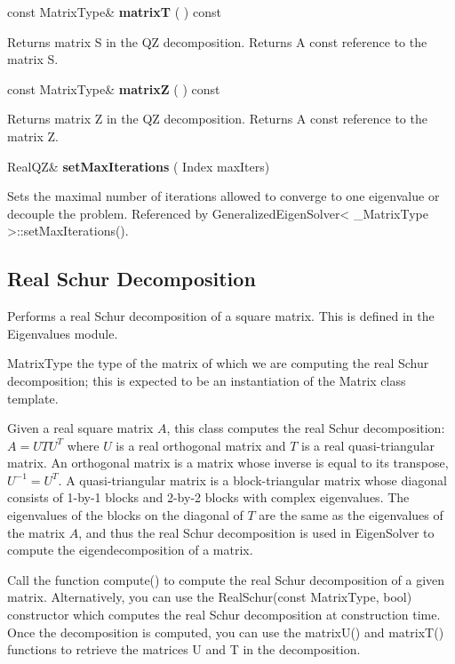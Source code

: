\vspace{0.3cm}
const MatrixType\& \textbf{matrixT}  ( )  const 

Returns matrix S in the QZ decomposition. 
Returns
A const reference to the matrix S. 


\vspace{0.3cm}
const MatrixType\& \textbf{matrixZ}  ( )  const 

Returns matrix Z in the QZ decomposition. 
Returns
A const reference to the matrix Z. 

\vspace{0.3cm}
RealQZ\& \textbf{setMaxIterations}  ( Index  maxIters)   

Sets the maximal number of iterations allowed to converge to one eigenvalue or decouple the problem. 
Referenced by GeneralizedEigenSolver< \_MatrixType >::setMaxIterations().











\newpage
\subsection{Real Schur Decomposition}
\label{Real Schur Decomposition}

Performs a real Schur decomposition of a square matrix. 
This is defined in the Eigenvalues module.


MatrixType the type of the matrix of which we are computing the real Schur decomposition; this is expected to be an instantiation of the Matrix class template. 

Given a real square matrix $A$, this class computes the real Schur decomposition: $A = U T U^T$ where $U$ is a real orthogonal matrix and $T$ is a real quasi-triangular matrix. An orthogonal matrix is a matrix whose inverse is equal to its transpose, $U^{-1} = U^T$. A quasi-triangular matrix is a block-triangular matrix whose diagonal consists of 1-by-1 blocks and 2-by-2 blocks with complex eigenvalues. The eigenvalues of the blocks on the diagonal of $T$ are the same as the eigenvalues of the matrix $A$, and thus the real Schur decomposition is used in EigenSolver to compute the eigendecomposition of a matrix.

Call the function compute() to compute the real Schur decomposition of a given matrix. Alternatively, you can use the RealSchur(const MatrixType, bool) constructor which computes the real Schur decomposition at construction time. Once the decomposition is computed, you can use the matrixU() and matrixT() functions to retrieve the matrices U and T in the decomposition.

